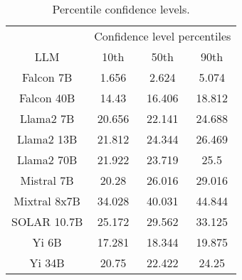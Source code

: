 \begin{table*}
\centering
\begin{tabular}{c|c|c|c}
& \multicolumn{3}{c}{Confidence level percentiles} \\ 
LLM & 10th & 50th & 90th\\ \hline
Falcon 7B & 1.656 & 2.624 & 5.074\\
Falcon 40B & 14.43 & 16.406 & 18.812\\
Llama2 7B & 20.656 & 22.141 & 24.688\\
Llama2 13B & 21.812 & 24.344 & 26.469\\
Llama2 70B & 21.922 & 23.719 & 25.5\\
Mistral 7B & 20.28 & 26.016 & 29.016\\
Mixtral 8x7B & 34.028 & 40.031 & 44.844\\
SOLAR 10.7B & 25.172 & 29.562 & 33.125\\
Yi 6B & 17.281 & 18.344 & 19.875\\
Yi 34B & 20.75 & 22.422 & 24.25\\
\hline
\end{tabular}
\caption{Percentile confidence levels.}
\label{tab:percentile_conf}
\end{table*}
